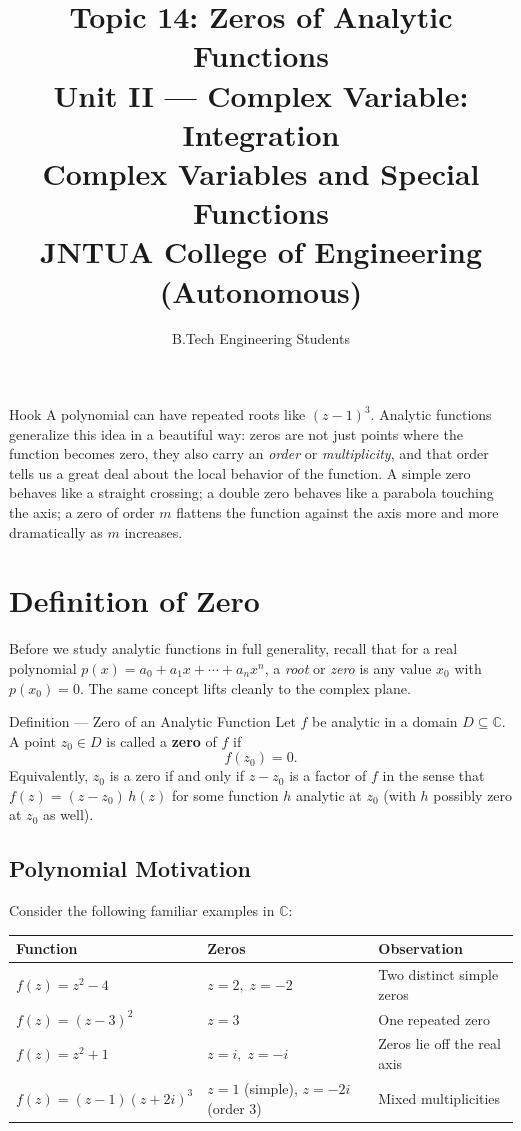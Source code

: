 \documentclass[12pt,a4paper]{article}
\title{\textbf{Topic 14: Zeros of Analytic Functions}\\[6pt]
       \large Unit II --- Complex Variable: Integration\\
       Complex Variables and Special Functions\\
       JNTUA College of Engineering (Autonomous)}
\author{B.Tech Engineering Students}
\date{}
\begin{document}
\maketitle
\tableofcontents
\newpage

\begin{curiositybox}{Hook}
A polynomial can have repeated roots like $(z-1)^3$. Analytic functions generalize this idea
in a beautiful way: zeros are not just points where the function becomes zero, they also carry
an \emph{order} or \emph{multiplicity}, and that order tells us a great deal about the local
behavior of the function. A simple zero behaves like a straight crossing; a double zero behaves
like a parabola touching the axis; a zero of order $m$ flattens the function against the axis
more and more dramatically as $m$ increases.
\end{curiositybox}

\section{Definition of Zero}

Before we study analytic functions in full generality, recall that for a real polynomial
$p(x) = a_0 + a_1 x + \cdots + a_n x^n$, a \emph{root} or \emph{zero} is any value $x_0$
with $p(x_0) = 0$. The same concept lifts cleanly to the complex plane.

\begin{infobox}{Definition --- Zero of an Analytic Function}
Let $f$ be analytic in a domain $D \subseteq \mathbb{C}$. A point $z_0 \in D$ is called a
\textbf{zero} of $f$ if
\[
  f(z_0) = 0.
\]
Equivalently, $z_0$ is a zero if and only if $z - z_0$ is a factor of $f$ in the sense that
$f(z) = (z-z_0)\,h(z)$ for some function $h$ analytic at $z_0$ (with $h$ possibly zero
at $z_0$ as well).
\end{infobox}

\subsection*{Polynomial Motivation}

Consider the following familiar examples in $\mathbb{C}$:

\begin{center}
\begin{tabular}{lll}
\toprule
\textbf{Function} & \textbf{Zeros} & \textbf{Observation}\\
\midrule
$f(z) = z^2 - 4$ & $z = 2,\; z = -2$ & Two distinct simple zeros\\
$f(z) = (z - 3)^2$ & $z = 3$ & One repeated zero\\
$f(z) = z^2 + 1$ & $z = i,\; z = -i$ & Zeros lie off the real axis\\
$f(z) = (z-1)(z+2i)^3$ & $z=1$ (simple), $z=-2i$ (order 3) & Mixed multiplicities\\
\bottomrule
\end{tabular}
\end{center}
\end{document}
